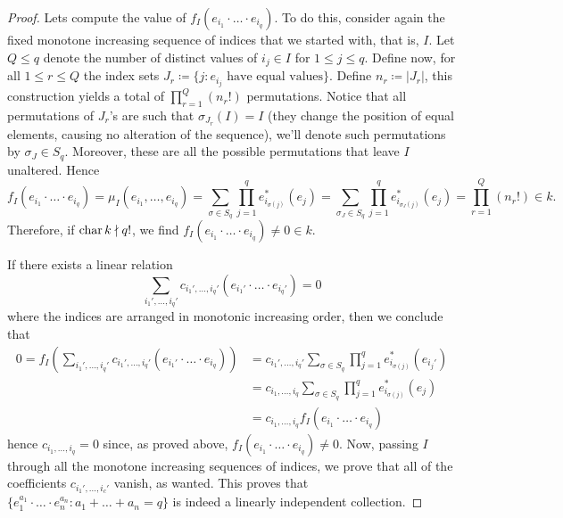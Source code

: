 \begin{proof}
    Lets compute the value of \(f_I(e_{i_1} \cdot \ldots \cdot e_{i_q})\). To do
    this, consider again the fixed monotone increasing sequence of indices that we
    started with, that is, \(I\). Let \(Q \leq q\) denote the number of distinct
    values of \(i_j \in I\) for \(1 \leq j \leq q\). Define now, for all \(1 \leq
    r \leq Q\) the index sets \(J_r \coloneq \{j \colon e_{i_j} \text{ have equal
        values}\}\). Define \(n_r \coloneq |J_r|\), this construction yields a total of
    \(\prod_{r=1}^Q (n_r!)\) permutations. Notice that all permutations of
    \(J_r\)'s are such that \(\sigma_{J_r}(I) = I\) (they change the position of
    equal elements, causing no alteration of the sequence), we'll denote such
    permutations by \(\sigma_J \in S_q\). Moreover, these are
    all the possible permutations that leave \(I\) unaltered. Hence
    \[
        f_I(e_{i_1} \cdot \ldots \cdot e_{i_q}) = \mu_I(e_{i_1}, \dots, e_{i_q})
        = \sum_{\sigma \in S_q} \prod_{j=1}^q e_{i_{\sigma(j)}}^*(e_j)
        = \sum_{\sigma_J \in S_q} \prod_{j=1}^q e_{i_{\sigma_J(j)}}^*(e_j)
        = \prod_{r=1}^Q (n_r!) \in k.
    \]
    Therefore, if \(\operatorname{char} k \nmid q!\), we find \(f_I(e_{i_1} \cdot \ldots \cdot
    e_{i_q}) \neq 0 \in k\).

    If there exists a linear relation
    \[
        \sum_{i_1', \dots, i_q'} c_{i_1', \dots, i_q'} (e_{i_1'} \cdot \ldots \cdot
        e_{i_q'}) = 0
    \]
    where the indices are arranged in monotonic increasing order, then we conclude
    that
    \begin{align*}
        0 = f_I \left( \sum_{i_1', \dots, i_q'} c_{i_1', \dots, i_q'} (e_{i_1'} \cdot
        \ldots \cdot e_{i_q}) \right)
         & = c_{i_1', \dots, i_q'} \sum_{\sigma \in S_q} \prod_{j=1}^q
        e_{i_{\sigma(j)}}^*(e_{i_j'})                                     \\
         & = c_{i_1, \dots, i_q} \sum_{\sigma \in S_q} \prod_{j=1}^q
        e_{i_{\sigma(j)}}^*(e_j)                                          \\
         & =  c_{i_1, \dots, i_q} f_I(e_{i_1} \cdot \ldots \cdot e_{i_q})
    \end{align*}
    hence \(c_{i_1, \dots, i_q} = 0\) since, as proved above, \(f_I(e_{i_1} \cdot
    \ldots \cdot e_{i_q}) \neq 0\). Now, passing \(I\) through all the monotone
    increasing sequences of indices, we prove that all of the coefficients
    \(c_{i_1', \dots, i_c'}\) vanish, as wanted. This proves that \(\{e_1^{a_1}
    \cdot \ldots \cdot e_n^{a_n} \colon a_1 + \dots + a_n = q\}\) is indeed a linearly
    independent collection.
\end{proof}


